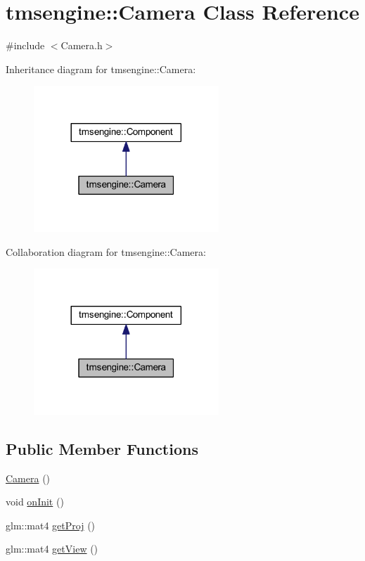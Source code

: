 \hypertarget{classtmsengine_1_1_camera}{}\section{tmsengine\+:\+:Camera Class Reference}
\label{classtmsengine_1_1_camera}


{\ttfamily \#include $<$Camera.\+h$>$}



Inheritance diagram for tmsengine\+:\+:Camera\+:\nopagebreak
\begin{figure}[H]
\begin{center}
\leavevmode
\includegraphics[width=197pt]{classtmsengine_1_1_camera__inherit__graph}
\end{center}
\end{figure}


Collaboration diagram for tmsengine\+:\+:Camera\+:\nopagebreak
\begin{figure}[H]
\begin{center}
\leavevmode
\includegraphics[width=197pt]{classtmsengine_1_1_camera__coll__graph}
\end{center}
\end{figure}
\subsection*{Public Member Functions}
\begin{DoxyCompactItemize}
\item 
\hyperlink{classtmsengine_1_1_camera_a01f94c3543f56ede7af49dc778f19331}{Camera} ()
\item 
void \hyperlink{classtmsengine_1_1_camera_a344a385fcb4cdf0d4d8c78fb5f2cba16}{on\+Init} ()
\item 
glm\+::mat4 \hyperlink{classtmsengine_1_1_camera_a9825b8479b94c3ced71f3e4810b66268}{get\+Proj} ()
\item 
glm\+::mat4 \hyperlink{classtmsengine_1_1_camera_a9fd979b84ae4959a77a85090976137db}{get\+View} ()
\end{DoxyCompactItemize}

